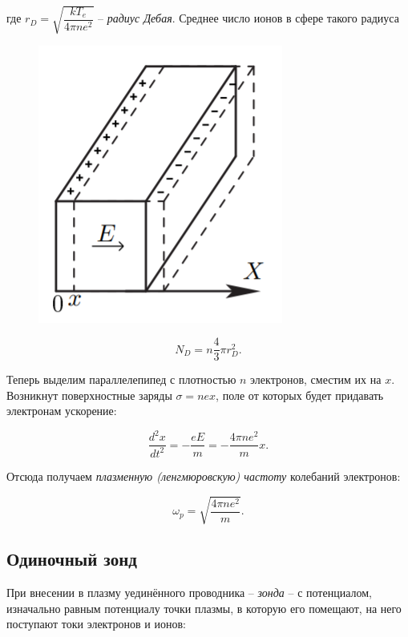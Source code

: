 \documentclass[a4paper, 12pt]{article}
\begin{document}
            где $r_D = \sqrt{\dfrac{kT_e}{4\pi n e^2}}$ -- \textit{радиус Дебая}. Среднее число ионов в сфере такого радиуса

            \begin{figure}
                \includegraphics[scale=0.5]{img/2.png}
            \end{figure}

            \begin{equation}
                N_D = n\dfrac{4}{3}\pi r_D^2.
            \end{equation}

            Теперь выделим параллелепипед с плотностью $n$ электронов, сместим их на $x$. Возникнут поверхностные заряды $\sigma = nex$, поле от которых будет придавать электронам ускорение:

            $$
                \dfrac{d^2x}{dt^2}=-\dfrac{eE}{m}=-\dfrac{4\pi n e^2}{m}x.
            $$

            Отсюда получаем \textit{плазменную (ленгмюровскую) частоту} колебаний электронов:

            \begin{equation}
                \omega_p = \sqrt{\dfrac{4\pi ne^2}{m}}.
            \end{equation}

        \subsection*{Одиночный зонд}

            При внесении в плазму уединённого проводника -- \textit{зонда} -- с потенциалом, изначально равным потенциалу точки плазмы, в которую его помещают, на него поступают токи электронов и ионов:
\end{document}
